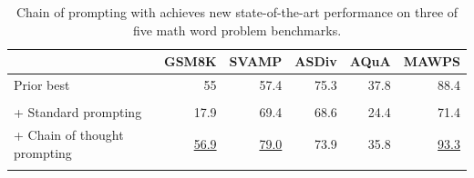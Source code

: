 \begin{table}[h]
    \setlength{\tabcolsep}{3.5pt}
    \caption{
    Chain of prompting with \palm{} achieves new state-of-the-art performance on three of five math word problem benchmarks.
    }
    \small
    \centering
    \begin{tabular}{lrrrrr}
        \toprule
          & GSM8K & SVAMP & ASDiv & AQuA & MAWPS \\
         \hline
         Prior best & 55 & 57.4 & 75.3 & 37.8 & 88.4 \\
         \underline{\palm{}} \\
         + Standard prompting & 17.9 & 69.4 & 68.6 & 24.4 & 71.4 \\
         + Chain of thought prompting & \underline{56.9} & \underline{79.0} & 73.9 & 35.8 & \underline{93.3} \\
         \bottomrule
         \\
    \end{tabular}
    \label{tab:gsm8k-highlight}
    \vspace{-3mm}
\end{table}
